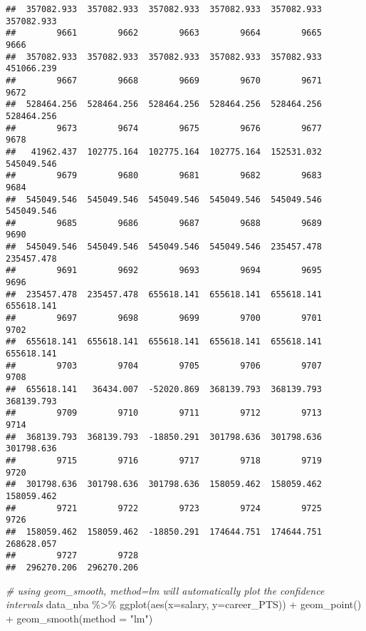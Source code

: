 \documentclass[
]{book}
\newenvironment{Shaded}{\begin{snugshade}}{\end{snugshade}}
\newcommand{\AttributeTok}[1]{\textcolor[rgb]{0.77,0.63,0.00}{#1}}
\newcommand{\AttributeTok}[1]{\textcolor[rgb]{0.13,0.29,0.53}{#1}}
\newcommand{\CommentTok}[1]{\textcolor[rgb]{0.56,0.35,0.01}{\textit{#1}}}
\newcommand{\FunctionTok}[1]{\textcolor[rgb]{0.00,0.00,0.00}{#1}}
\newcommand{\FunctionTok}[1]{\textcolor[rgb]{0.13,0.29,0.53}{\textbf{#1}}}
\newcommand{\NormalTok}[1]{#1}
\newcommand{\SpecialCharTok}[1]{\textcolor[rgb]{0.00,0.00,0.00}{#1}}
\newcommand{\SpecialCharTok}[1]{\textcolor[rgb]{0.81,0.36,0.00}{\textbf{#1}}}
\newcommand{\StringTok}[1]{\textcolor[rgb]{0.31,0.60,0.02}{#1}}
\begin{document}
\begin{verbatim}
##  357082.933  357082.933  357082.933  357082.933  357082.933  357082.933 
##        9661        9662        9663        9664        9665        9666 
##  357082.933  357082.933  357082.933  357082.933  357082.933  451066.239 
##        9667        9668        9669        9670        9671        9672 
##  528464.256  528464.256  528464.256  528464.256  528464.256  528464.256 
##        9673        9674        9675        9676        9677        9678 
##   41962.437  102775.164  102775.164  102775.164  152531.032  545049.546 
##        9679        9680        9681        9682        9683        9684 
##  545049.546  545049.546  545049.546  545049.546  545049.546  545049.546 
##        9685        9686        9687        9688        9689        9690 
##  545049.546  545049.546  545049.546  545049.546  235457.478  235457.478 
##        9691        9692        9693        9694        9695        9696 
##  235457.478  235457.478  655618.141  655618.141  655618.141  655618.141 
##        9697        9698        9699        9700        9701        9702 
##  655618.141  655618.141  655618.141  655618.141  655618.141  655618.141 
##        9703        9704        9705        9706        9707        9708 
##  655618.141   36434.007  -52020.869  368139.793  368139.793  368139.793 
##        9709        9710        9711        9712        9713        9714 
##  368139.793  368139.793  -18850.291  301798.636  301798.636  301798.636 
##        9715        9716        9717        9718        9719        9720 
##  301798.636  301798.636  301798.636  158059.462  158059.462  158059.462 
##        9721        9722        9723        9724        9725        9726 
##  158059.462  158059.462  -18850.291  174644.751  174644.751  268628.057 
##        9727        9728 
##  296270.206  296270.206
\end{verbatim}

\begin{Shaded}
\begin{Highlighting}[]
\CommentTok{\# using geom\_smooth, method=lm will automatically plot the confidence intervals}
\NormalTok{data\_nba }\SpecialCharTok{\%\textgreater{}\%}
  \FunctionTok{ggplot}\NormalTok{(}\FunctionTok{aes}\NormalTok{(}\AttributeTok{x=}\NormalTok{salary, }\AttributeTok{y=}\NormalTok{career\_PTS)) }\SpecialCharTok{+}
  \FunctionTok{geom\_point}\NormalTok{() }\SpecialCharTok{+}
  \FunctionTok{geom\_smooth}\NormalTok{(}\AttributeTok{method =} \StringTok{"lm"}\NormalTok{)}
\end{Highlighting}
\end{Shaded}
\end{document}

